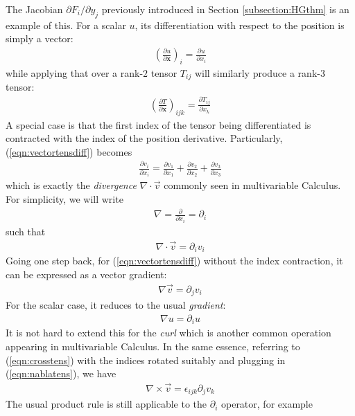 The Jacobian $\partial F_i/\partial y_j$ previously introduced in Section \ref{subsection:HGthm} is an example of this. For a scalar $u$, its differentiation with respect to the position is simply a vector:
\begin{align}
\left(\frac{\partial u}{\partial \textbf{x}}\right)_i = \frac{\partial u}{\partial x_i}
\end{align}
while applying that over a rank-$2$ tensor $T_{ij}$ will similarly produce a rank-$3$ tensor:
\begin{align}
\left(\frac{\partial T}{\partial \textbf{x}}\right)_{ijk} = \frac{\partial T_{ij}}{\partial x_k}
\end{align}
A special case is that the first index of the tensor being differentiated is contracted with the index of the position derivative. Particularly, (\ref{eqn:vectortensdiff}) becomes
\begin{align}
\frac{\partial v_i}{\partial x_i} = \frac{\partial v_1}{\partial x_1} + \frac{\partial v_2}{\partial x_2} + \frac{\partial v_3}{\partial x_3}
\end{align}
which is exactly the \textit{divergence} $\nabla \cdot \vec{v}$ commonly seen in multivariable Calculus. For simplicity, we will write 
\begin{align}
\nabla = \frac{\partial}{\partial x_i} = \partial_i \label{eqn:nablatens}
\end{align}
such that
\begin{align}
\nabla \cdot \vec{v} = \partial_i v_i \label{eqn:divv}
\end{align}
Going one step back, for (\ref{eqn:vectortensdiff}) without the index contraction, it can be expressed as a vector gradient:
\begin{align}
\nabla \vec{v} = \partial_j v_i
\end{align}
For the scalar case, it reduces to the usual \textit{gradient}:
\begin{align}
\nabla u = \partial_i u
\end{align}
It is not hard to extend this for the \textit{curl} which is another common operation appearing in multivariable Calculus. In the same essence, referring to (\ref{eqn:crosstens}) with the indices rotated suitably and plugging in (\ref{eqn:nablatens}), we have
\begin{align}
\nabla \times \vec{v} = \epsilon_{ijk} \partial_j v_k \label{eqn:curltens}
\end{align}
The usual product rule is still applicable to the $\partial_i$ operator, for example
